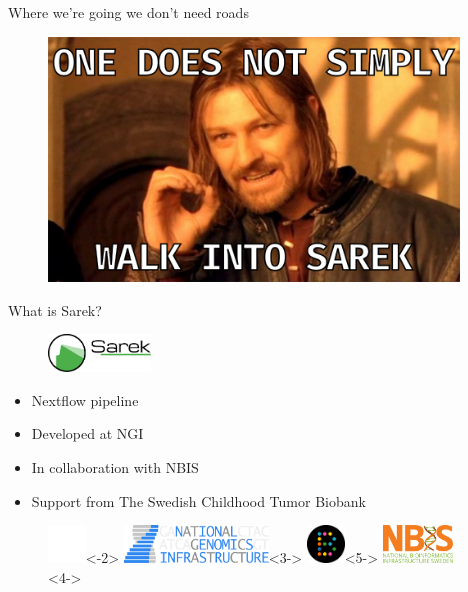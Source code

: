 \documentclass[usepdftitle=false]{beamer}
\begin{document}
\begin{frame}{Where we're going we don't need roads}
	\begin{figure}
		\includegraphics[height=6.5cm]{pictures/OneDoesNotSimply-meme.png}
	\end{figure}
\end{frame}

\begin{frame}{What is Sarek?}
	\begin{figure}
		\includegraphics[height=1cm]{pictures/Sarek_no_border}
	\end{figure}
	\begin{itemize}
		\pause
		\item Nextflow pipeline
		\item<3-> Developed at NGI
		\item<4-> In collaboration with NBIS
		\item<5-> Support from The Swedish Childhood Tumor Biobank
	\end{itemize}
	\begin{figure}
		\includegraphics[height=1cm]{pictures/blank}<-2>
		\includegraphics[height=1cm]{pictures/NGI}<3->
		\only<3->{\hfill}
		\includegraphics[height=1cm]{pictures/Barntumorbanken}<5->
		\only<4->{\hfill}
		\includegraphics[height=1cm]{pictures/NBIS}<4->
	\end{figure}
	\vfill
\end{frame}
\end{document}
